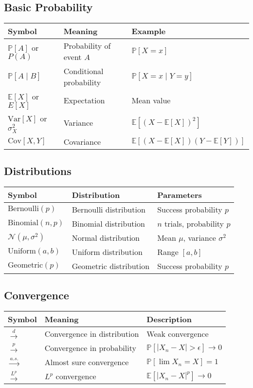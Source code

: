\subsection{Basic Probability}

\begin{tabular}{|l|l|l|}
\hline
\textbf{Symbol} & \textbf{Meaning} & \textbf{Example} \\
\hline
$\mathbb{P}[A]$ or $P(A)$ & Probability of event $A$ & $\mathbb{P}[X = x]$ \\
$\mathbb{P}[A \mid B]$ & Conditional probability & $\mathbb{P}[X = x \mid Y = y]$ \\
$\mathbb{E}[X]$ or $E[X]$ & Expectation & Mean value \\
$\text{Var}[X]$ or $\sigma^2_X$ & Variance & $\mathbb{E}[(X - \mathbb{E}[X])^2]$ \\
$\text{Cov}[X,Y]$ & Covariance & $\mathbb{E}[(X - \mathbb{E}[X])(Y - \mathbb{E}[Y])]$ \\
\hline
\end{tabular}

\subsection{Distributions}

\begin{tabular}{|l|l|l|}
\hline
\textbf{Symbol} & \textbf{Distribution} & \textbf{Parameters} \\
\hline
$\text{Bernoulli}(p)$ & Bernoulli distribution & Success probability $p$ \\
$\text{Binomial}(n,p)$ & Binomial distribution & $n$ trials, probability $p$ \\
$\mathcal{N}(\mu, \sigma^2)$ & Normal distribution & Mean $\mu$, variance $\sigma^2$ \\
$\text{Uniform}(a,b)$ & Uniform distribution & Range $[a,b]$ \\
$\text{Geometric}(p)$ & Geometric distribution & Success probability $p$ \\
\hline
\end{tabular}

\subsection{Convergence}

\begin{tabular}{|l|l|l|}
\hline
\textbf{Symbol} & \textbf{Meaning} & \textbf{Description} \\
\hline
$\xrightarrow{d}$ & Convergence in distribution & Weak convergence \\
$\xrightarrow{p}$ & Convergence in probability & $\mathbb{P}[|X_n - X| > \epsilon] \to 0$ \\
$\xrightarrow{a.s.}$ & Almost sure convergence & $\mathbb{P}[\lim X_n = X] = 1$ \\
$\xrightarrow{L^p}$ & $L^p$ convergence & $\mathbb{E}[|X_n - X|^p] \to 0$ \\
\hline
\end{tabular}

